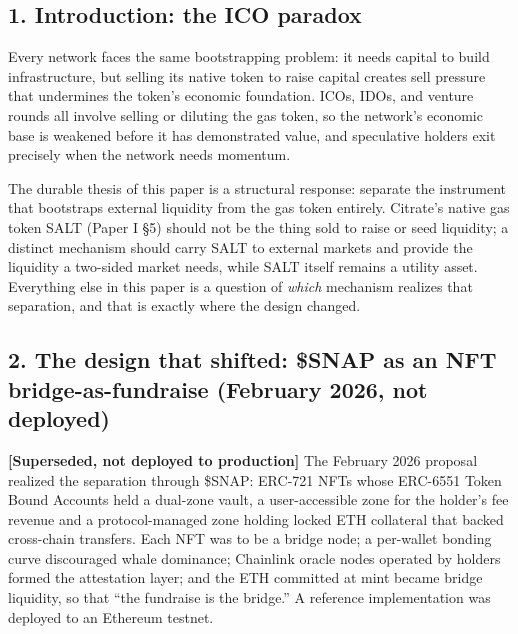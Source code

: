 \subsection{1. Introduction: the ICO
paradox}\label{introduction-the-ico-paradox}

Every network faces the same bootstrapping problem: it needs capital to
build infrastructure, but selling its native token to raise capital
creates sell pressure that undermines the token's economic foundation.
ICOs, IDOs, and venture rounds all involve selling or diluting the gas
token, so the network's economic base is weakened before it has
demonstrated value, and speculative holders exit precisely when the
network needs momentum.

The durable thesis of this paper is a structural response: separate the
instrument that bootstraps external liquidity from the gas token
entirely. Citrate's native gas token SALT (Paper I §5) should not be the
thing sold to raise or seed liquidity; a distinct mechanism should carry
SALT to external markets and provide the liquidity a two-sided market
needs, while SALT itself remains a utility asset. Everything else in
this paper is a question of \emph{which} mechanism realizes that
separation, and that is exactly where the design changed.

\subsection{2. The design that shifted: \$SNAP as an NFT
bridge-as-fundraise (February 2026, not
deployed)}\label{the-design-that-shifted-snap-as-an-nft-bridge-as-fundraise-february-2026-not-deployed}

\textbf{{[}Superseded, not deployed to production{]}} The February 2026
proposal realized the separation through \$SNAP: ERC-721 NFTs whose
ERC-6551 Token Bound Accounts held a dual-zone vault, a user-accessible
zone for the holder's fee revenue and a protocol-managed zone holding
locked ETH collateral that backed cross-chain transfers. Each NFT was to
be a bridge node; a per-wallet bonding curve discouraged whale
dominance; Chainlink oracle nodes operated by holders formed the
attestation layer; and the ETH committed at mint became bridge
liquidity, so that ``the fundraise is the bridge.'' A reference
implementation was deployed to an Ethereum testnet.

